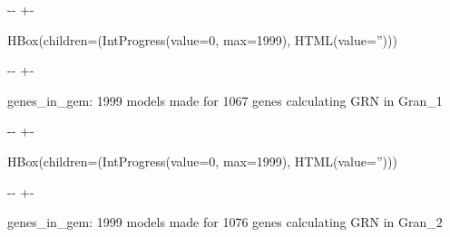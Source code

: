 \documentclass[letterpaper,10pt,english]{sphinxmanual}
\newlength\nbsphinxcodecellspacing
\begin{document}
{

\kern-\sphinxverbatimsmallskipamount\kern-\baselineskip
\kern+\FrameHeightAdjust\kern-\fboxrule
\vspace{\nbsphinxcodecellspacing}

\begin{sphinxVerbatim}[commandchars=\\\{\}]
HBox(children=(IntProgress(value=0, max=1999), HTML(value='')))
\end{sphinxVerbatim}
}

{

\kern-\sphinxverbatimsmallskipamount\kern-\baselineskip
\kern+\FrameHeightAdjust\kern-\fboxrule
\vspace{\nbsphinxcodecellspacing}

\begin{sphinxVerbatim}[commandchars=\\\{\}]

genes\_in\_gem: 1999
models made for 1067 genes
calculating GRN in Gran\_1
\end{sphinxVerbatim}
}

{

\kern-\sphinxverbatimsmallskipamount\kern-\baselineskip
\kern+\FrameHeightAdjust\kern-\fboxrule
\vspace{\nbsphinxcodecellspacing}

\begin{sphinxVerbatim}[commandchars=\\\{\}]
HBox(children=(IntProgress(value=0, max=1999), HTML(value='')))
\end{sphinxVerbatim}
}

{

\kern-\sphinxverbatimsmallskipamount\kern-\baselineskip
\kern+\FrameHeightAdjust\kern-\fboxrule
\vspace{\nbsphinxcodecellspacing}

\begin{sphinxVerbatim}[commandchars=\\\{\}]

genes\_in\_gem: 1999
models made for 1076 genes
calculating GRN in Gran\_2
\end{sphinxVerbatim}
}
\end{document}
